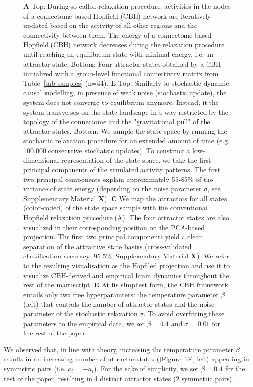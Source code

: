 \documentclass{article}
\begin{document}
\begin{figure}[!htbp]
{\textbf{A} Top: During so-called relaxation procedure, activities in the nodes of a connectome-based Hopfield (CBH) network are iteratively updated based on the activity of all other regions and the connectivity between them.
The energy of a connectome-based Hopfield (CBH) network decreases during the relaxation procedure until reaching an equilibrium state with minimal energy, i.e. an attractor state.
Bottom: Four attractor states obtained by a CBH initialized with a group-level functional connectivity matrix from Table~\ref{tab-samples} (n=44).
\textbf{B} Top: Similarly to stochastic dynamic causal modelling, in presence of weak noise (stochastic update), the system does not converge to equilibrium anymore. Instead, it the system transverses on the state landscape in a way restricted by the topology of the connectome and the "gravitational pull" of the attractor states.
Bottom: We sample the state space by running the stochastic relaxation procedure for an extended amount of time (e.g. 100.000 consecutive stochatsic updates). To construct a low-dimensional representation of the state space, we take the first principal components of the simulated activity patterns. The first two principal components explain approximately 55-85\% of the variance of state energy (depending on the noise parameter $\sigma$, see Supplementary Material \textbf{X}).
\textbf{C} We map the attractors for all states (color-coded) of the state space sample with the conventional Hopfield relaxation procedure (A). The four attractor states are also visualized in their corresponding position on the PCA-based projection. The first two principal components yield a clear separation of the attractive state basins (cross-validated classification accuracy: 95.5\%, Supplementary Material \textbf{X}). We refer to the resulting visualization as the Hopfiled projection and use it to visualize CBH-derived and empirical brain dynamics throughout the rest of the manuscript.
\textbf{E} At its simpliest form, the CBH framework entails only two free hyperparamters: the temperature parameter $\beta$ (left) that controls the number of attractor states and the noise parameter of the stochastic relaxation $\sigma$. To avoid overfitting these parameters to the empirical data, we set $\beta=0.4$ and $\sigma=0.01$ for the rest of the paper.}
\label{attractors}
\end{figure}

We observed that, in line with theory, increasing the temperature parameter $\beta$ results in an increasing number of attractor states ((Figure~\ref{attractors}E, left) appearing in symmetric pairs (i.e. $a_i = -a_j$). For the sake of simplicity, we set $\beta=0.4$ for the rest of the paper, resulting in 4 distinct attractor states (2 symmetric pairs).
\end{document}
